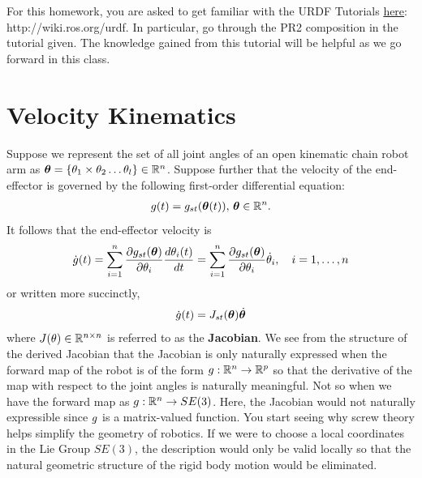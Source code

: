 \begin{homework}
	For this homework, you are asked to get familiar with the URDF Tutorials \href{http://wiki.ros.org/urdf}{here}: http://wiki.ros.org/urdf. In particular, go through the PR2 composition in the tutorial given. The knowledge gained from this tutorial will be helpful as we go forward in this class.
\end{homework}

\section{Velocity Kinematics}

Suppose we represent the set of all joint angles of an open kinematic chain robot arm as $\bm{\theta} = \{\theta_1 \times \theta_2 \ldots \theta_l\} \in \mathbb{R}^n$. Suppose further that the velocity of the end-effector is governed by the following first-order differential equation:
%
\begin{align}
	g(t) = g_{st}(\bm{\theta}(t)), \, \bm{\theta} \in \mathbb{R}^n.
\end{align}
%
It follows that the end-effector velocity is 
%
\begin{align}
	\dot{g}(t) = \sum_{i=1}^{n} \dfrac{\partial g_{st}(\bm{\theta})}{\partial \theta_i} \dfrac{d \theta_i(t)}{d t} =  \sum_{i=1}^{n} \dfrac{\partial g_{st}(\bm{\theta})}{\partial \theta_i} \dot{\theta}_i, \quad i = 1, \ldots, n
	\label{eq:jacob_gen}
\end{align}
%
or written more succinctly,
%
\[
	\dot{g}(t) = J_{st}(\bm{\theta})\dot{\bm{\theta}}
\]
%
where $J(\theta) \in \mathbb{R}^{n\times n}$ is referred to as the \textbf{Jacobian}. We see from the structure of the derived Jacobian that the Jacobian is only naturally expressed when the forward map of the robot is of the form $g: \mathbb{R}^n \rightarrow \mathbb{R}^p$ so that the derivative of the map with respect to the joint angles is naturally meaningful. Not so when we have the forward map as $g: \mathbb{R}^n \rightarrow SE(3)$. Here, the Jacobian would not naturally expressible  since $g$ is a matrix-valued function. You start seeing why screw theory helps simplify the geometry of robotics. If we were to choose a local coordinates in the Lie Group $SE(3)$, the description would only be valid locally so that the natural geometric structure of the rigid body motion would be eliminated.

